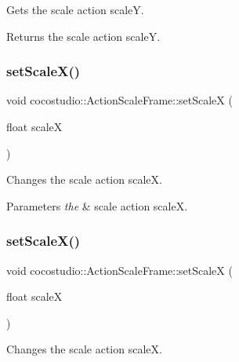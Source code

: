 Gets the scale action scaleY.

\begin{DoxyReturn}{Returns}
the scale action scaleY. 
\end{DoxyReturn}
\mbox{\label{classcocostudio_1_1ActionScaleFrame_ad3d2121b08ecfeaf332d97d5493a4502}} 
\subsubsection{\texorpdfstring{set\+Scale\+X()}{setScaleX()}\hspace{0.1cm}{\footnotesize\ttfamily [1/2]}}
{\footnotesize\ttfamily void cocostudio\+::\+Action\+Scale\+Frame\+::set\+ScaleX (\begin{DoxyParamCaption}\item[{float}]{scaleX }\end{DoxyParamCaption})}

Changes the scale action scaleX.


\begin{DoxyParams}{Parameters}
{\em the} & scale action scaleX. \\
\hline
\end{DoxyParams}
\mbox{\label{classcocostudio_1_1ActionScaleFrame_ad3d2121b08ecfeaf332d97d5493a4502}} 
\subsubsection{\texorpdfstring{set\+Scale\+X()}{setScaleX()}\hspace{0.1cm}{\footnotesize\ttfamily [2/2]}}
{\footnotesize\ttfamily void cocostudio\+::\+Action\+Scale\+Frame\+::set\+ScaleX (\begin{DoxyParamCaption}\item[{float}]{scaleX }\end{DoxyParamCaption})}

Changes the scale action scaleX.


